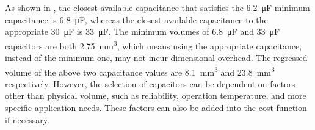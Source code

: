 As shown in , the closest available capacitance that satisfies the \SI{6.2}{\micro\farad} minimum capacitance is \SI{6.8}{\micro\farad}, whereas the closest available capacitance to the appropriate \SI{30}{\micro\farad} is \SI{33}{\micro\farad}. 
The minimum volumes of \SI{6.8}{\micro\farad} and \SI{33}{\micro\farad} capacitors are both \SI{2.75}{\cubic\milli\meter}, which means using the appropriate capacitance, instead of the minimum one, may not incur dimensional overhead. 
The regressed volume of the above two capacitance values are \SI{8.1}{\cubic\milli\meter} and \SI{23.8}{\cubic\milli\meter} respectively. 
However, the selection of capacitors can be dependent on factors other than physical volume, such as reliability, operation temperature, and more specific application needs. 
These factors can also be added into the cost function if necessary. 


